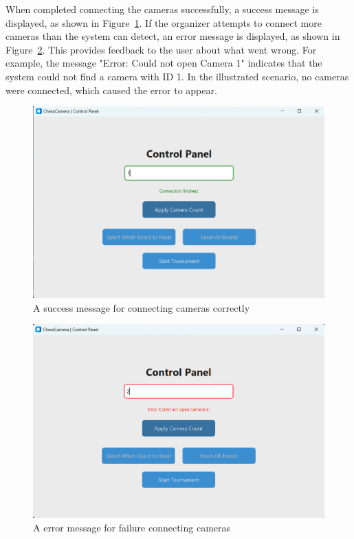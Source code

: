 When completed connecting the cameras successfully, a success message is displayed, as shown in Figure~\ref{fig:control-panel-camera-success}. If the organizer attempts to connect more cameras than the system can detect, an error message is displayed, as shown in Figure~\ref{fig:control-panel-camera-error}. This provides feedback to the user about what went wrong. For example, the message "Error: Could not open Camera 1" indicates that the system could not find a camera with ID 1. In the illustrated scenario, no cameras were connected, which caused the error to appear. \\

\begin{figure}[h!] \centering \includegraphics[width=0.75\linewidth]{figures/results/frontend/control-panel/camera-success.png} \caption[Success message for camera connections]{A success message for  connecting cameras correctly}\label{fig:control-panel-camera-success} \end{figure}

\begin{figure}[h!] \centering \includegraphics[width=0.75\linewidth]{figures/results/frontend/control-panel/camera-error.png} \caption[Error message for camera connections]{A error message for failure connecting cameras}\label{fig:control-panel-camera-error} \end{figure}

